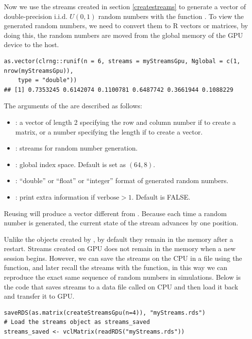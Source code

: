 \documentclass[article,nojss]{jss}\usepackage[]{graphicx}\usepackage[]{color}
\makeatletter
\newenvironment{kframe}{%
 \def\at@end@of@kframe{}%
 \ifinner\ifhmode%
  \def\at@end@of@kframe{\end{minipage}}%
  \begin{minipage}{\columnwidth}%
 \fi\fi%
 \def\FrameCommand##1{\hskip\@totalleftmargin \hskip-\fboxsep
 \colorbox{shadecolor}{##1}\hskip-\fboxsep
     \hskip-\linewidth \hskip-\@totalleftmargin \hskip\columnwidth}%
 \MakeFramed {\advance\hsize-\width
   \@totalleftmargin\z@ \linewidth\hsize
   \@setminipage}}%
 {\par\unskip\endMakeFramed%
 \at@end@of@kframe}
\newenvironment{knitrout}{}{} %
\newcommand{\fct}[1]{\code{#1()}}
\makeatother
\begin{document}
Now we use the streams created in section \ref{createstreams} to generate a vector of double-precision i.i.d. $U(0,1)$ random numbers with the function \fct{runif}. To view the generated random numbers, we need to convert them to R vectors or matrices, by doing this, the random numbers are moved from the global memory of the GPU device to the host.
\begin{knitrout}
\color{fgcolor}\begin{kframe}
\begin{verbatim}
as.vector(clrng::runif(n = 6, streams = myStreamsGpu, Nglobal = c(1, nrow(myStreamsGpu)),
    type = "double"))
## [1] 0.7353245 0.6142074 0.1100781 0.6487742 0.3661944 0.1088229
\end{verbatim}
\end{kframe}
\end{knitrout}
The arguments of the \fct{clrng::runif} are described as follows:
\begin{itemize}
\itemsep0em 
  \item {}: a vector of length 2 specifying the row and column number if to create a matrix, or a number specifying the length if to create a vector.
  \item {}: streams for random number generation.
  \item {}: global index space. Default is set as $(64,8)$.
  \item {}: ``double'' or ``float'' or ``integer'' format of generated random numbers.
  \item {}: print extra information if $\text{verbose} > 1$. Default is FALSE.
\end{itemize}
Reusing  will produce a vector different from . Because each time a random number is generated, the current state of the stream advances by one position. %

Unlike the objects created by , by default they remain in the memory after a restart. Streams created on GPU does not remain in the memory when a new  session begins. However, we can save the streams on the CPU in a file using the \fct{saveRDS} function, and later recall the streams with the \fct{readRDS} function, in this way we can reproduce the exact same sequence of random numbers in simulations. Below is the code that saves streams to a data file called  on CPU and then load it back and transfer it to GPU.
\begin{knitrout}
\color{fgcolor}\begin{kframe}
\begin{verbatim}
saveRDS(as.matrix(createStreamsGpu(n=4)), "myStreams.rds")
# Load the streams object as streams_saved
streams_saved <- vclMatrix(readRDS("myStreams.rds"))
\end{verbatim}
\end{kframe}
\end{knitrout}
\end{document}
